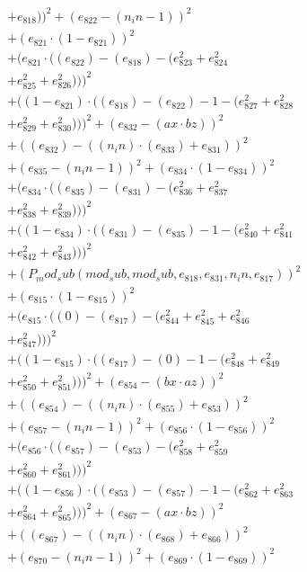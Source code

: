 \documentclass[10pt, a4paper]{article}
\begin{document}
\begin{align*}
& + e_{818}))^{2} + (e_{822} - (n_in - 1))^{2} \\
& + (e_{821}  \cdot  (1 - e_{821}))^{2} \\
& + (e_{821}  \cdot  ((e_{822}) - (e_{818}) - (e_{823}^{2} + e_{824}^{2} \\
& + e_{825}^{2} + e_{826}^{2})))^{2} \\
& + ((1 - e_{821})  \cdot  ((e_{818}) - (e_{822}) - 1 - (e_{827}^{2} + e_{828}^{2} \\
& + e_{829}^{2} + e_{830}^{2})))^{2} + (e_{832} - (ax  \cdot  bz))^{2} \\
& + ((e_{832}) - ((n_in)  \cdot  (e_{833}) + e_{831}))^{2} \\
& + (e_{835} - (n_in - 1))^{2} + (e_{834}  \cdot  (1 - e_{834}))^{2} \\
& + (e_{834}  \cdot  ((e_{835}) - (e_{831}) - (e_{836}^{2} + e_{837}^{2} \\
& + e_{838}^{2} + e_{839}^{2})))^{2} \\
& + ((1 - e_{834})  \cdot  ((e_{831}) - (e_{835}) - 1 - (e_{840}^{2} + e_{841}^{2} \\
& + e_{842}^{2} + e_{843}^{2})))^{2} \\
& + (P_mod_sub(mod_sub, mod_sub, e_{818}, e_{831}, n_in, e_{817}))^{2} \\
& + (e_{815}  \cdot  (1 - e_{815}))^{2} \\
& + (e_{815}  \cdot  ((0) - (e_{817}) - (e_{844}^{2} + e_{845}^{2} + e_{846}^{2} \\
& + e_{847}^{2})))^{2} \\
& + ((1 - e_{815})  \cdot  ((e_{817}) - (0) - 1 - (e_{848}^{2} + e_{849}^{2} \\
& + e_{850}^{2} + e_{851}^{2})))^{2} + (e_{854} - (bx  \cdot  az))^{2} \\
& + ((e_{854}) - ((n_in)  \cdot  (e_{855}) + e_{853}))^{2} \\
& + (e_{857} - (n_in - 1))^{2} + (e_{856}  \cdot  (1 - e_{856}))^{2} \\
& + (e_{856}  \cdot  ((e_{857}) - (e_{853}) - (e_{858}^{2} + e_{859}^{2} \\
& + e_{860}^{2} + e_{861}^{2})))^{2} \\
& + ((1 - e_{856})  \cdot  ((e_{853}) - (e_{857}) - 1 - (e_{862}^{2} + e_{863}^{2} \\
& + e_{864}^{2} + e_{865}^{2})))^{2} + (e_{867} - (ax  \cdot  bz))^{2} \\
& + ((e_{867}) - ((n_in)  \cdot  (e_{868}) + e_{866}))^{2} \\
& + (e_{870} - (n_in - 1))^{2} + (e_{869}  \cdot  (1 - e_{869}))^{2} \\

\end{align*}
\end{document}
